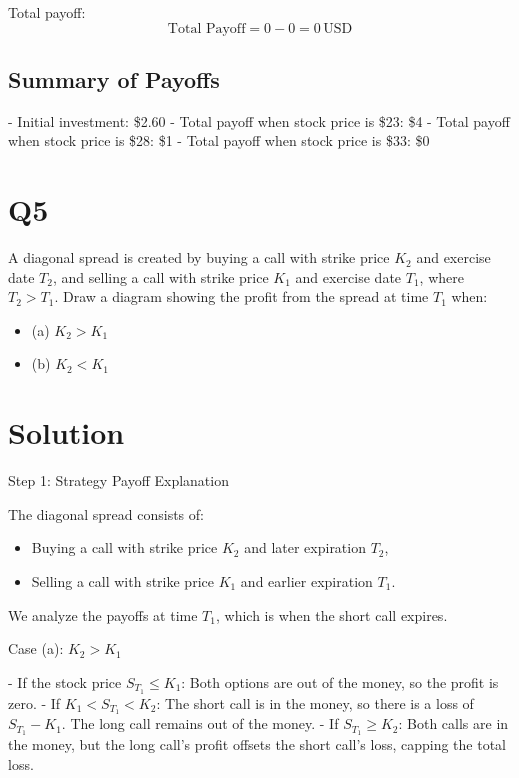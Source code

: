 \documentclass[12pt,letterpaper, onecolumn]{exam}
\begin{document}
Total payoff:
\[
\text{Total Payoff} = 0 - 0 = 0 \, \text{USD}
\]

\subsection*{Summary of Payoffs}

- Initial investment: \$2.60
- Total payoff when stock price is \$23: \$4
- Total payoff when stock price is \$28: \$1
- Total payoff when stock price is \$33: \$0

\newpage

\section*{Q5}

A diagonal spread is created by buying a call with strike price \( K_2 \) and exercise date \( T_2 \), and selling a call with strike price \( K_1 \) and exercise date \( T_1 \), where \( T_2 > T_1 \). Draw a diagram showing the profit from the spread at time \( T_1 \) when:
\begin{itemize}
    \item (a) \( K_2 > K_1 \)
    \item (b) \( K_2 < K_1 \)
\end{itemize}

\section*{Solution}

Step 1: Strategy Payoff Explanation

The diagonal spread consists of:
\begin{itemize}
    \item Buying a call with strike price \( K_2 \) and later expiration \( T_2 \),
    \item Selling a call with strike price \( K_1 \) and earlier expiration \( T_1 \).
\end{itemize}

We analyze the payoffs at time \( T_1 \), which is when the short call expires.

Case (a): \( K_2 > K_1 \)

- If the stock price \( S_{T_1} \leq K_1 \): Both options are out of the money, so the profit is zero.
- If \( K_1 < S_{T_1} < K_2 \): The short call is in the money, so there is a loss of \( S_{T_1} - K_1 \). The long call remains out of the money.
- If \( S_{T_1} \geq K_2 \): Both calls are in the money, but the long call's profit offsets the short call's loss, capping the total loss.
\end{document}
